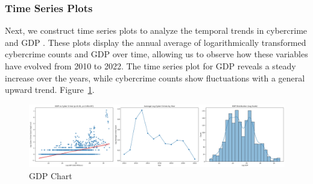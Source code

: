     \subsubsection{Time Series Plots} %
        Next, we construct time series plots to analyze the temporal trends in cybercrime and GDP .
        These plots display the annual average of logarithmically transformed cybercrime counts and GDP over time,
        allowing us to observe how these variables have evolved from 2010 to 2022.
        The time series plot for GDP reveals a steady increase over the years,
        while cybercrime counts show fluctuations with a general upward trend.
        Figure~\ref{fig:gdp}.
        \begin{figure}[htbp]
            \centering
            \includegraphics[width=1\linewidth]{../rsrc/demographics/gdp_crime_and_time}
            \caption{GDP Chart}\label{fig:gdp}
        \end{figure}

